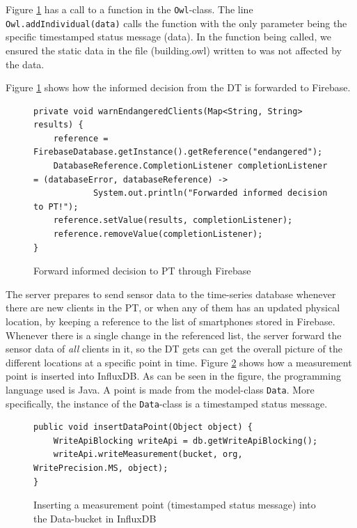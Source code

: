 \documentclass{article}
\begin{document}
Figure \ref{fig:server_forward_informed_decision} has a call to a function in the \verb|Owl|-class. The line \verb|Owl.addIndividual(data)| calls the function with the only parameter being the specific timestamped status message (data). In the function being called, we ensured the static data in the file (building.owl) written to was not affected by the data.


Figure \ref{fig:server_forward_informed_decision} shows how the informed decision from the DT is forwarded to Firebase.
\begin{figure}
    \centering
    \begin{small}
    \begin{verbatim}
private void warnEndangeredClients(Map<String, String> results) {
    reference = FirebaseDatabase.getInstance().getReference("endangered");
    DatabaseReference.CompletionListener completionListener = (databaseError, databaseReference) ->
            System.out.println("Forwarded informed decision to PT!");
    reference.setValue(results, completionListener);
    reference.removeValue(completionListener);
}
    \end{verbatim}
    \end{small}
    \caption{Forward informed decision to PT through Firebase}
    \label{fig:server_forward_informed_decision}
\end{figure}


The server prepares to send sensor data to the time-series database whenever there are new clients in the PT, or when any of them has an updated physical location, by keeping a reference to the list of smartphones stored in Firebase. Whenever there is a single change in the referenced list, the server forward the sensor data of \emph{all} clients in it, so the DT gets can get the overall picture of the different locations at a specific point in time. Figure \ref{fig:insert_point} shows how a measurement point is inserted into InfluxDB. As can be seen in the figure, the programming language used is Java. A point is made from the model-class \verb|Data|. More specifically, the instance of the \verb|Data|-class is a timestamped status message.

\begin{figure}[H]
    \centering
    \begin{verbatim}
public void insertDataPoint(Object object) {
    WriteApiBlocking writeApi = db.getWriteApiBlocking();
    writeApi.writeMeasurement(bucket, org, WritePrecision.MS, object);
}
    \end{verbatim}
    \caption{Inserting a measurement point (timestamped status message) into the Data-bucket in InfluxDB}
    \label{fig:insert_point}
\end{figure}
\end{document}
